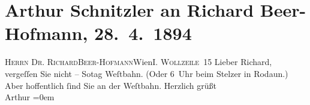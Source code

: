 

         
         \renewcommand{\erwaehntePersonen}{Personen: Richard Beer-Hofmann}
         \renewcommand{\erwaehnteInstitutionen}{Institutionen: Westbahnstrecke}
         \renewcommand{\erwaehnteOrte}{Orte: Gasthaus Stelzer, I., Innere Stadt, IX., Alsergrund, Rodaun, Wien, Wollzeile}
         \renewcommand{\erwaehnteWerke}{}
               \section[Arthur Schnitzler an Richard Beer-Hofmann, 28. 4. 1894]{ Arthur Schnitzler an Richard Beer-Hofmann, 28. 4. 1894}\nopagebreak{}\rehead{ }\begin{ledgroupsized}[t]{13cm}\normalsize\beginnumbering \toendnotes[C]{\smallbreak\pagebreak[2]} 
\toendnotes[C]{\smallbreak}\pstart{}{\pb}\textsc{Herrn Dr. Richard}\pend{}\pstart{}\textsc{Beer-Hofmann}\pend{}\pstart{}Wien\pend{}\pstart{}\textsc{I. Wollzeile 15}\pend{}{\bigskip}\pstart
           \noindent{}{\pb}Lieber Richard, vergeſſen Sie nicht –
                     So{\geminationn}tag{ }\label{K_L00316-1v}\label{K_L00316-1h}{ }Weſtbahn.\pend
           \pstart
           (Oder 6 Uhr beim Stelzer in Rodaun.)\pend
           \pstart
           Aber hoffentlich ſind Sie an der Weſtbahn.\pend
           \pstart
           Herzlich grüßt{\\[\baselineskip]}\spacefill\mbox{Arthur}\pend
           \leftskip=0em{}
         
         \endnumbering{}\end{ledgroupsized}  \newcommand{\dateiname}{L00316}\newcommand{\titel}{Arthur Schnitzler an Richard Beer-Hofmann, 28. 4. 1894}\newcommand{\editorInnen}{Martin Anton Müller und Gerd-Hermann Susen}
      